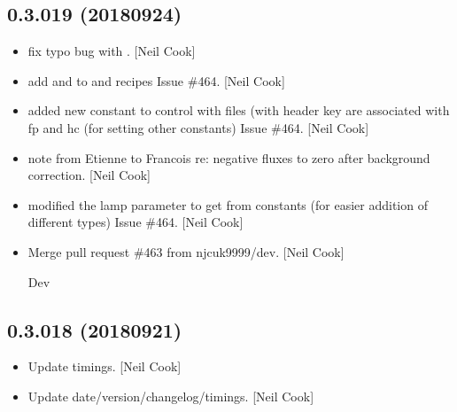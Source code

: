 \documentclass[a4paper,10pt,english]{report}
\begin{document}
\subsection{0.3.019 (2018\sphinxhyphen{}09\sphinxhyphen{}24)}
\label{\detokenize{misc/changelog:id332}}\begin{itemize}
\item {} 
 \sphinxhyphen{} fix typo bug with
. {[}Neil Cook{]}

\item {} 
 \sphinxhyphen{} add  and  to  and
 recipes \sphinxhyphen{} Issue \#464. {[}Neil Cook{]}

\item {} 
 \sphinxhyphen{} added new constant to control with files
(with header key  are associated with fp and hc (for
setting other constants) \sphinxhyphen{} Issue \#464. {[}Neil Cook{]}

\item {} 
 \sphinxhyphen{} note from Etienne to Francois re: negative
fluxes to zero after background correction. {[}Neil Cook{]}

\item {} 
 \sphinxhyphen{} modified the lamp parameter to get from
constants (for easier addition of different types) \sphinxhyphen{} Issue \#464. {[}Neil
Cook{]}

\item {} 
Merge pull request \#463 from njcuk9999/dev. {[}Neil Cook{]}

Dev

\end{itemize}


\subsection{0.3.018 (2018\sphinxhyphen{}09\sphinxhyphen{}21)}
\label{\detokenize{misc/changelog:id333}}\begin{itemize}
\item {} 
Update timings. {[}Neil Cook{]}

\item {} 
Update date/version/changelog/timings. {[}Neil Cook{]}

\end{itemize}
\end{document}
